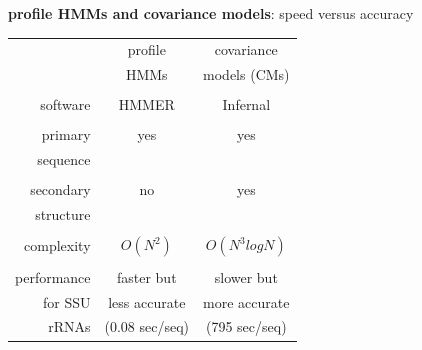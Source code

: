 \documentclass[landscape]{slides}
\begin{document}
\begin{slide}
\begin{center}
\textbf{profile HMMs and covariance models}: speed versus accuracy
\end{center}
\medskip


\begin{minipage}{6in}
\begin{center}
\small
\begin{tabular}{r|cc|} 
             & profile & covariance  \\
             & HMMs    & models (CMs) \\ \hline
  & & \\
  software   & {\sc HMMER}     & {\sc Infernal} \\ 
  & & \\
  primary & yes & yes \\
  sequence & & \\
  & & \\
  secondary & no & yes \\
  structure & & \\
  & & \\
  complexity & $O(N^2)$ & $O(N^{3} log N)$ \\
  & & \\
  performance& faster but    & slower but    \\
  for SSU    & less accurate      & more accurate \\
  rRNAs      & (0.08 sec/seq)     & (795 sec/seq) \\
\end{tabular}
\end{center}

\end{minipage}
\end{slide}
\end{document}
